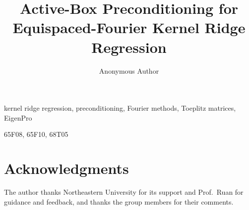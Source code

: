 \documentclass[final,hidelinks]{siamart251216}
\title{Active-Box Preconditioning for Equispaced-Fourier Kernel Ridge Regression}
\author{Anonymous Author}
\begin{document}
\maketitle


\begin{keywords}
kernel ridge regression, preconditioning, Fourier methods, Toeplitz matrices,
EigenPro
\end{keywords}

\begin{MSCcodes}
65F08, 65F10, 68T05
\end{MSCcodes}







\appendix




\section*{Acknowledgments}
The author thanks Northeastern University for its support and Prof.\ Ruan for
guidance and feedback, and thanks the group members for their comments.



\end{document}
